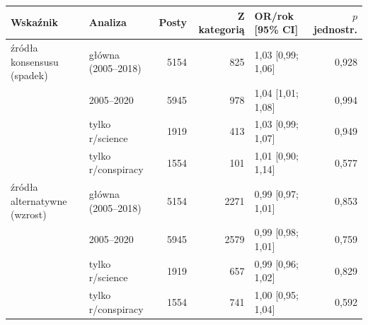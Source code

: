 \begin{tabular}{llrrlr}
\toprule
Wskaźnik & Analiza & Posty & Z kategorią & OR/rok [95\% CI] & $p$ jednostr. \\
\midrule
źródła konsensusu (spadek) & główna (2005--2018) & 5154 & 825 & 1{,}03 [0{,}99; 1{,}06] & 0{,}928 \\
 & 2005--2020 & 5945 & 978 & 1{,}04 [1{,}01; 1{,}08] & 0{,}994 \\
 & tylko r/science & 1919 & 413 & 1{,}03 [0{,}99; 1{,}07] & 0{,}949 \\
 & tylko r/conspiracy & 1554 & 101 & 1{,}01 [0{,}90; 1{,}14] & 0{,}577 \\
\midrule
źródła alternatywne (wzrost) & główna (2005--2018) & 5154 & 2271 & 0{,}99 [0{,}97; 1{,}01] & 0{,}853 \\
 & 2005--2020 & 5945 & 2579 & 0{,}99 [0{,}98; 1{,}01] & 0{,}759 \\
 & tylko r/science & 1919 & 657 & 0{,}99 [0{,}96; 1{,}02] & 0{,}829 \\
 & tylko r/conspiracy & 1554 & 741 & 1{,}00 [0{,}95; 1{,}04] & 0{,}592 \\
\bottomrule
\end{tabular}
